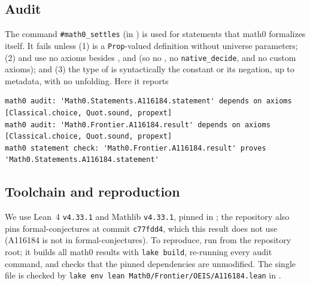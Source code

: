 \documentclass[11pt]{amsart}
\theoremstyle{plain}
\theoremstyle{definition}
\begin{document}
\subsection*{Audit}
The command \texttt{\#math0\_settles} (in ) is used for statements that math0 formalizes itself. It fails unless (1)  is a \texttt{Prop}-valued definition without universe parameters; (2)  and  use no axioms besides ,  and  (so no , no \texttt{native\_decide}, and no custom axioms); and (3) the type of  is syntactically the constant  or its negation, up to metadata, with no unfolding. Here it reports
\begin{lstlisting}[basicstyle=\ttfamily\scriptsize]
math0 audit: 'Math0.Statements.A116184.statement' depends on axioms [Classical.choice, Quot.sound, propext]
math0 audit: 'Math0.Frontier.A116184.result' depends on axioms [Classical.choice, Quot.sound, propext]
math0 statement check: 'Math0.Frontier.A116184.result' proves 'Math0.Statements.A116184.statement'
\end{lstlisting}

\subsection*{Toolchain and reproduction}
We use Lean~4 \cite{Lean4} \texttt{v4.33.1} and Mathlib \cite{Mathlib} \texttt{v4.33.1}, pinned in ; the repository also pins formal-conjectures \cite{FC} at commit \texttt{c77fdd4}, which this result does not use (A116184 is not in formal-conjectures). To reproduce, run  from the repository root; it builds all math0 results with \texttt{lake build}, re-running every audit command, and checks that the pinned dependencies are unmodified. The single file is checked by \texttt{lake env lean Math0/Frontier/OEIS/A116184.lean} in .
\end{document}
